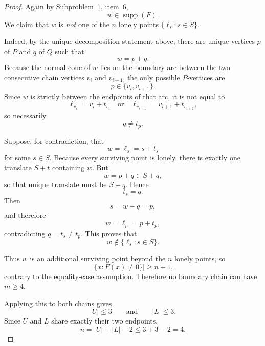 \begin{proof}
Again by Subproblem~1, item~\(6\),
\[
w\in \operatorname{supp}(F).
\]
We claim that \(w\) is \emph{not} one of the \(n\) lonely points \(\{\ell_s:s\in S\}\).

Indeed, by the unique-decomposition statement above, there are unique vertices \(p\) of \(P\) and \(q\) of \(Q\) such that
\[
w=p+q.
\]
Because the normal cone of \(w\) lies on the boundary arc between the two consecutive chain vertices \(v_i\) and \(v_{i+1}\), the only possible \(P\)-vertices are
\[
p\in\{v_i,v_{i+1}\}.
\]
Since \(w\) is strictly between the endpoints of that arc, it is not equal to
\[
\ell_{v_i}=v_i+t_{v_i}
\quad\text{or}\quad
\ell_{v_{i+1}}=v_{i+1}+t_{v_{i+1}},
\]
so necessarily
\[
q\neq t_p.
\]

Suppose, for contradiction, that
\[
w=\ell_s=s+t_s
\]
for some \(s\in S\). Because every surviving point is lonely, there is exactly one translate \(S+t\) containing \(w\). But
\[
w=p+q\in S+q,
\]
so that unique translate must be \(S+q\). Hence
\[
t_s=q.
\]
Then
\[
s=w-q=p,
\]
and therefore
\[
w=\ell_p=p+t_p,
\]
contradicting \(q=t_s\neq t_p\). This proves that
\[
w\notin \{\ell_s:s\in S\}.
\]

Thus \(w\) is an additional surviving point beyond the \(n\) lonely points, so
\[
|\{x:F(x)\neq 0\}|\ge n+1,
\]
contrary to the equality-case assumption. Therefore no boundary chain can have \(m\ge 4\).

Applying this to both chains gives
\[
|U|\le 3
\qquad\text{and}\qquad
|L|\le 3.
\]
Since \(U\) and \(L\) share exactly their two endpoints,
\[
n=|U|+|L|-2\le 3+3-2=4.
\]
\end{proof}